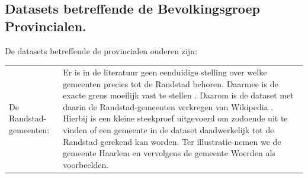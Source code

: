 \newpage
\subsection{Datasets betreffende de Bevolkingsgroep Provincialen.}
De datasets betreffende de provincialen ouderen zijn:\\

\noindent\begin{tabularx}{\textwidth}{LI}
De Randstad-gemeenten: &  Er is in de literatuur geen eenduidige stelling over welke gemeenten precies tot de Randstad behoren. Daarmee is de exacte grens moeilijk vast te stellen \citep{nijmeijer2000randstad}. Daarom is de dataset met daarin de Randstad-gemeenten verkregen van Wikipedia \citeyearpar{randstad}. Hierbij is een kleine steekproef uitgevoerd om zodoende uit te vinden of een gemeente in de dataset daadwerkelijk tot de Randstad gerekend kan worden. Ter illustratie nemen we de gemeente Haarlem en vervolgens de gemeente Woerden als voorbeelden. 


\end{tabularx}
